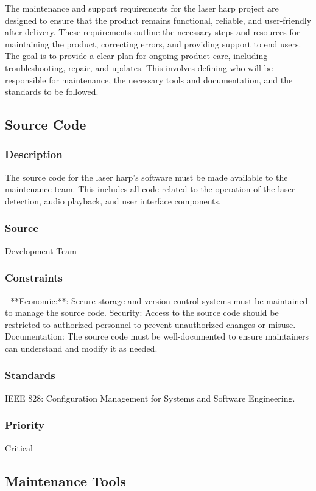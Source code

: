 The maintenance and support requirements for the laser harp project are designed to ensure that the product remains functional, reliable, and user-friendly after delivery. These requirements outline the necessary steps and resources for maintaining the product, correcting errors, and providing support to end users. The goal is to provide a clear plan for ongoing product care, including troubleshooting, repair, and updates. This involves defining who will be responsible for maintenance, the necessary tools and documentation, and the standards to be followed.


\subsection{Source Code}
\subsubsection{Description}
The source code for the laser harp's software must be made available to the maintenance team. This includes all code related to the operation of the laser detection, audio playback, and user interface components.
\subsubsection{Source}
Development Team
\subsubsection{Constraints}
- **Economic:**: Secure storage and version control systems must be maintained to manage the source code.
Security: Access to the source code should be restricted to authorized personnel to prevent unauthorized changes or misuse.
Documentation: The source code must be well-documented to ensure maintainers can understand and modify it as needed.
\subsubsection{Standards}
IEEE 828: Configuration Management for Systems and Software Engineering.
\subsubsection{Priority}
Critical


\subsection{Maintenance Tools}
